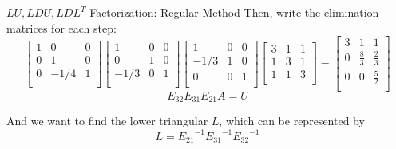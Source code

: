 \documentclass{beamer}
\begin{document}
\begin{frame}{$LU, LDU, LDL^T$ Factorization: Regular Method}
Then, write the elimination matrices for each step:
\begin{equation*}
    \left[ \begin{matrix}
        1&		0&		0\\
        0&		1&		0\\
        0&		-1/4&		1\\
    \end{matrix} \right]\left[ \begin{matrix}
        1&		0&		0\\
        0&		1&		0\\
        -1/3&		0&		1\\
    \end{matrix} \right]\left[ \begin{matrix}
        1&		0&		0\\
        -1/3&		1&		0\\
        0&		0&		1\\
    \end{matrix} \right] \left[ \begin{matrix}
        3&		1&		1\\
        1&		3&		1\\
        1&		1&		3\\
    \end{matrix} \right] =\left[ \begin{matrix}
        3&		1&		1\\
        0&		\frac{8}{3}&		\frac{2}{3}\\
        0&		0&		\frac{5}{2}\\
    \end{matrix} \right]
\end{equation*}
\begin{equation*}
    E_{32}E_{31}E_{21}A=U
\end{equation*}

And we want to find the lower triangular $L$, which can be represented by
\begin{equation*}
    L={E_{21}}^{-1}{E_{31}}^{-1}{E_{32}}^{-1}
\end{equation*}
\end{frame}
\end{document}

